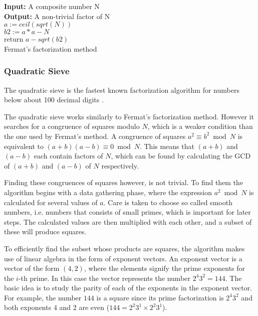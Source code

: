\documentclass[paper=a4, fontsize=11pt,numbers=endperiod]{scrartcl} %
\numberwithin{equation}{section} %
\numberwithin{figure}{section} %
\numberwithin{table}{section} %
\begin{document}
\begin{algorithm}[H]
 \SetAlgoLined %
 \textbf{Input:} {A composite number N}\\
 \textbf{Output:} {A non-trivial factor of N}\\
 $a := ceil(sqrt(N))$\\
 $b2 := a*a - N$\\
  return $a-sqrt(b2)$\;
  \hspace{0pt}\\
  \caption{Fermat's factorization method \cite{fermat}}
\end{algorithm}

\subsubsection{Quadratic Sieve}
The quadratic sieve \cite{qsieve} is the fastest known factorization algorithm for numbers below about 100 decimal digits \cite{qsieve2}. 

The quadratic sieve works similarly to Fermat's factorization method.
However it searches for a congruence of squares modulo $N$, which is a weaker condition than the one used by Fermat's method.
A congruence of squares $a^2 \equiv b^2 \bmod N$ is equivalent to $(a+b)(a-b) \equiv 0 \bmod N$.
This means that $(a+b)$ and $(a-b)$ each contain factors of $N$, which can be found by calculating the GCD of $(a+b)$ and $(a-b)$ of $N$ respectively.

Finding these congruences of squares however, is not trivial.
To find them the algorithm begins with a data gathering phase, where the expression $a^2 \bmod N$ is calculated for several values of $a$.
Care is taken to choose so called smooth numbers, i.e. numbers that consists of small primes, which is important for later steps.
The calculated values are then multiplied with each other, and a subset of these will produce squares.

To efficiently find the subset whose products are squares, the algorithm makes use of linear algebra in the form of exponent vectors.
An exponent vector is a vector of the form $(4, 2)$, where the elements signify the prime exponents for the $i$-th prime.
In this case the vector represents the number $2^4 3^2 = 144$.
The basic idea is to study the parity of each of the exponents in the exponent vector.
For example, the number $144$ is a square since its prime factorization is $2^{4}3^2$ and both exponents $4$ and $2$ are even ($144 = 2^2 3^1\times2^2 3^1$).
\end{document}
